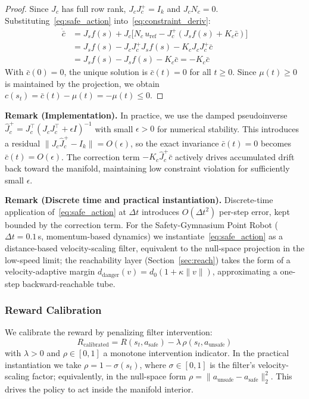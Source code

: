 \documentclass[letterpaper, 10 pt, conference]{ieeeconf}
\begin{document}
\begin{proof}
Since $J_c$ has full row rank, $J_c J_c^+ = I_k$ and $J_c N_c = 0$. Substituting~\eqref{eq:safe_action} into~\eqref{eq:constraint_deriv}:
\begin{align*}
\dot{\bar{c}} &= J_s f(s) + J_c \bigl[ N_c \, u_{\text{ref}} - J_c^+ (J_s f(s) + K_c \bar{c}) \bigr] \\
&= J_s f(s) - J_c J_c^+ J_s f(s) - K_c J_c J_c^+ \bar{c} \\
&= J_s f(s) - J_s f(s) - K_c \bar{c} = -K_c \bar{c}
\end{align*}
With $\bar{c}(0) = 0$, the unique solution is $\bar{c}(t) = 0$ for all $t \geq 0$. Since $\mu(t) \geq 0$ is maintained by the projection, we obtain $c(s_t) = \bar{c}(t) - \mu(t) = -\mu(t) \leq 0$.
\end{proof}

\textbf{Remark (Implementation).} In practice, we use the damped pseudoinverse $\hat{J}_c^+ = J_c^\top (J_c J_c^\top + \epsilon I)^{-1}$ with small $\epsilon > 0$ for numerical stability. This introduces a residual $\| J_c \hat{J}_c^+ - I_k \| = O(\epsilon)$, so the exact invariance $\bar{c}(t) = 0$ becomes $\bar{c}(t) = O(\epsilon)$. The correction term $-K_c \hat{J}_c^+ \bar{c}$ actively drives accumulated drift back toward the manifold, maintaining low constraint violation for sufficiently small $\epsilon$.

\textbf{Remark (Discrete time and practical instantiation).} Discrete-time application of~\eqref{eq:safe_action} at $\Delta t$ introduces $O(\Delta t^2)$ per-step error, kept bounded by the correction term. For the Safety-Gymnasium Point Robot ($\Delta t = 0.1$\,s, momentum-based dynamics) we instantiate~\eqref{eq:safe_action} as a distance-based velocity-scaling filter, equivalent to the null-space projection in the low-speed limit; the reachability layer (Section~\ref{sec:reach}) takes the form of a velocity-adaptive margin $d_{\text{danger}}(v) = d_0(1 + \kappa\|v\|)$, approximating a one-step backward-reachable tube.

\subsubsection{Reward Calibration}

We calibrate the reward by penalizing filter intervention:
\begin{equation}
    R_{\text{calibrated}} = R(s_t, a_{\text{safe}}) - \lambda \, \rho(s_t, a_{\text{unsafe}})
    \label{eq:reward_calib}
\end{equation}
with $\lambda > 0$ and $\rho \in [0, 1]$ a monotone intervention indicator. In the practical instantiation we take $\rho = 1 - \sigma(s_t)$, where $\sigma \in [0, 1]$ is the filter's velocity-scaling factor; equivalently, in the null-space form $\rho = \|a_{\text{unsafe}} - a_{\text{safe}}\|_2^2$. This drives the policy to act inside the manifold interior.
\end{document}
